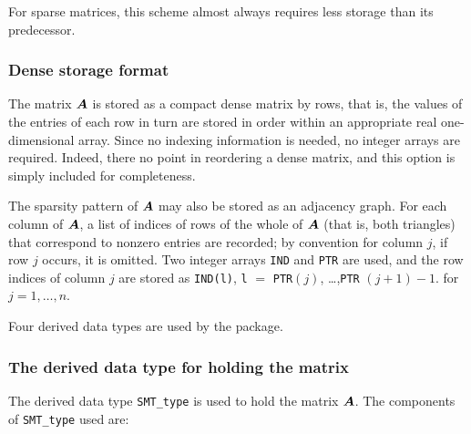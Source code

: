 \documentclass{galahad}
\begin{document}
For sparse matrices, this scheme almost always requires less storage than
its predecessor.

\subsubsection{Dense storage format}\label{dense}
The matrix ${\bm{A}}$ is stored as a compact
dense matrix by rows, that is, the values of the entries of each row in turn are
stored in order within an appropriate real one-dimensional array.
Since no indexing information is needed, no integer arrays are required.
Indeed, there no point in reordering a dense matrix, and this option
is simply included for completeness.


\galgraph
The sparsity pattern of ${\bm{A}}$ may also be stored as an adjacency graph.
For each column of ${\bm{A}}$, a list of indices of rows of the whole of 
${\bm{A}}$ (that is, both triangles) that correspond to nonzero entries are 
recorded; by convention for column $j$, if row $j$ occurs, it is omitted. 
Two integer arrays {\tt IND} and {\tt PTR}
are used, and the row indices of column $j$ are stored as
{\tt IND(l)}, {\tt l} $=$ {\tt PTR}$(j)$, \ldots ,{\tt PTR} $(j+1)-1$.
for $j = 1,\ldots,n$.





\galtypes
Four derived data types are used by the package.


\subsubsection{The derived data type for holding the matrix}\label{typeprob}
The derived data type {\tt SMT\_type} is used to hold the matrix ${\bm{A}}$.
The components of {\tt SMT\_type} used are:
\end{document}
